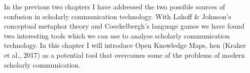 In the previous two chapters I have addressed the two possible sources of confusion in scholarly communication technology. With Lakoff & Johnson’s conceptual metaphor theory and Coeckelbergh’s language games we have found two interesting tools which we can use to analyse scholarly communication technology. In this chapter I will introduce Open Knowledge Maps, hen (Kraker et al., 2017) as a potential tool that overcomes some of the problems of modern scholarly communication. 